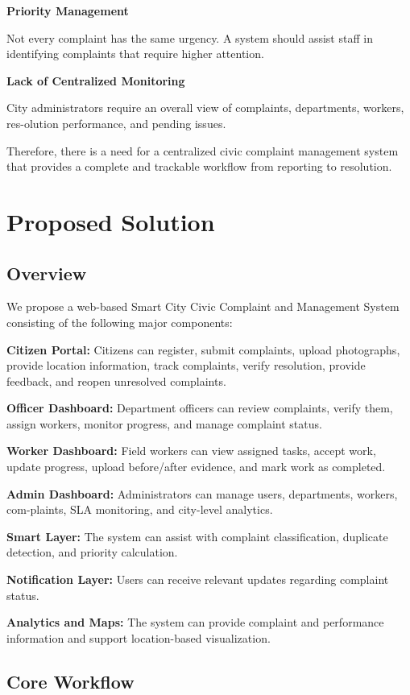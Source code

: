\documentclass[12pt,a4paper]{article}
\begin{document}
\textbf{Priority Management}\par
Not every complaint has the same urgency. A system should assist staff in identifying complaints that require higher attention.

\textbf{Lack of Centralized Monitoring}\par
City administrators require an overall view of complaints, departments, workers, res-olution performance, and pending issues.

Therefore, there is a need for a centralized civic complaint management system that provides a complete and trackable workflow from reporting to resolution.

\section{Proposed Solution}
\subsection{Overview}
We propose a web-based Smart City Civic Complaint and Management System consisting of the following major components:

\textbf{Citizen Portal:} Citizens can register, submit complaints, upload photographs, provide location information, track complaints, verify resolution, provide feedback, and reopen unresolved complaints.

\textbf{Officer Dashboard:} Department officers can review complaints, verify them, assign workers, monitor progress, and manage complaint status.

\textbf{Worker Dashboard:} Field workers can view assigned tasks, accept work, update progress, upload before/after evidence, and mark work as completed.

\textbf{Admin Dashboard:} Administrators can manage users, departments, workers, com-plaints, SLA monitoring, and city-level analytics.

\textbf{Smart Layer:} The system can assist with complaint classification, duplicate detection, and priority calculation.

\textbf{Notification Layer:} Users can receive relevant updates regarding complaint status.

\textbf{Analytics and Maps:} The system can provide complaint and performance information and support location-based visualization.

\subsection{Core Workflow}
\end{document}
